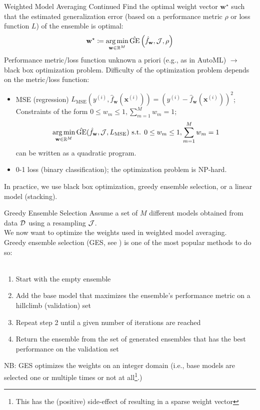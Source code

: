 \documentclass[10pt,compress,t,notes=noshow, xcolor=table]{beamer}
\begin{document}
\begin{frame}{Weighted Model Averaging Continued}
Find the optimal weight vector $\mathbf{w}^{\star}$ such that the estimated generalization error (based on a performance metric $\rho$ or loss function $L$) of the ensemble is optimal:
$$\mathbf{w}^{\star} \coloneqq \operatorname*{arg\,min}_{\mathbf{w} \in \mathbb{R}^{M}} \hat{\text{GE}}\left(\hat{f}_{\mathbf{w}}, \mathcal{J}, \rho\right)$$
\vfill
Performance metric/loss function unknown a priori (e.g., as in AutoML) $\rightarrow$ black box optimization problem.
\vfill
Difficulty of the optimization problem depends on the metric/loss function:
\begin{itemize}
    \item MSE (regression) $L_{\mathrm{MSE}}(y^{(i)}, \hat{f}_{\mathbf{w}}(\mathbf{x}^{(i)})) = (y^{(i)} - \hat{f}_{\mathbf{w}}(\mathbf{x}^{(i)}))^{2}$;\\
          Constraints of the form $0 \le w_{m} \le 1, \sum_{m=1}^{M} w_{m} = 1$;\\
          $$\operatorname*{arg\,min}_{\mathbf{w} \in \mathbb{R}^{M}} \hat{\text{GE}}(\hat{f}_{\mathbf{w}}, \mathcal{J}, L_{\mathrm{MSE}}) \text{ s.t. } 0 \le w_{m} \le 1, \sum_{m=1}^{M} w_{m} = 1$$
          can be written as a quadratic program.
    \item 0-1 loss (binary classification); the optimization problem is NP-hard.
\end{itemize}
\vfill
In practice, we use black box optimization, greedy ensemble selection, or a linear model (stacking).
\end{frame}



\begin{vbframe}{Greedy Ensemble Selection}
Assume a set of $M$ different models obtained from data $\mathcal{D}$ using a resampling $\mathcal{J}$.\\
We now want to optimize the weights used in weighted model averaging.\\
\vfill
Greedy ensemble selection (GES, see ) is one of the most popular methods to do so:\\\
\begin{enumerate}
    \item Start with the empty ensemble
    \item Add the base model that maximizes the ensemble's performance metric on a hillclimb (validation) set
    \item Repeat step 2 until a given number of iterations are reached
    \item Return the ensemble from the set of generated ensembles that has the best performance on the validation set
\end{enumerate}
\vfill
NB: GES optimizes the weights on an integer domain (i.e., base models are selected one or multiple times or not at all\footnote{This has the (positive) side-effect of resulting in a sparse weight vector}.)
\end{vbframe}
\end{document}

